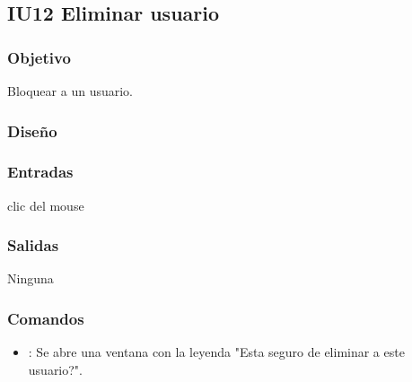 \newpage
\subsection{IU12 Eliminar usuario}

\subsubsection{Objetivo}
	Bloquear a un usuario.
	
\subsubsection{Diseño}
	 	


\subsubsection{Entradas}

	clic del mouse 
	

\subsubsection{Salidas}

	Ninguna

\subsubsection{Comandos}
\begin{itemize}
	\item {}: Se abre una ventana con la leyenda "Esta seguro de eliminar a este usuario?".
\end{itemize}
